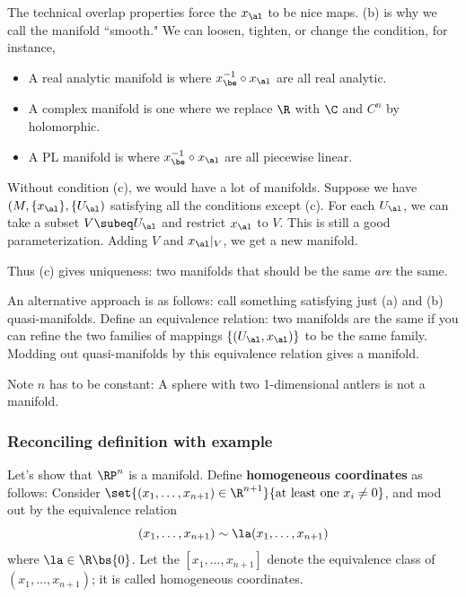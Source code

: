 The technical overlap properties force the $x_{\al}$ to be nice maps. (b) is why we call the manifold ``smooth." We can loosen, tighten, or change the condition, for instance,
\begin{itemize}
\item A real analytic manifold is where $x_{\be}^{-1}\circ x_{\al}$ are all real analytic.
\item A complex manifold is one where we replace $\R$ with $\C$ and $C^n$ by holomorphic.
\item A PL manifold is where $x_{\be}^{-1}\circ x_{\al}$ are all piecewise linear.
\end{itemize}

Without condition (c), we would have a lot of manifolds. Suppose we have $(M,\{x_{\al}\},\{U_{\al})$ satisfying all the conditions except (c). For each $U_{\al}$, we can take a subset $V\subeq U_{\al}$ and restrict $x_{\al}$ to $V$. This is still a good parameterization. Adding $V$ and $x_{\al}|_V$, we get a new manifold. 

Thus (c) gives uniqueness: two manifolds that should be the same {\it are} the same.

An alternative approach is as follows: call something satisfying just (a) and (b) quasi-manifolds. Define an equivalence relation: two manifolds are the same if you can refine the two families of mappings $\{(U_{\al},x_{\al})\}$ to be the same family. Modding out quasi-manifolds by this equivalence relation gives a manifold.

Note $n$ has to be constant: A sphere with two 1-dimensional antlers is not a manifold.

\subsubsection{Reconciling definition with example}

Let's show that $\RP^n$ is a manifold. Define \textbf{homogeneous coordinates} as follows: 
Consider $\set{(x_1,\ldots, x_{n+1})\in \R^{n+1}}{\text{at least one }x_i\ne 0}$, and mod out by the equivalence relation
\[
(x_1,\ldots, x_{n+1})\sim \la (x_1,\ldots, x_{n+1})
\]
where $\la\in \R\bs \{0\}$. Let the $[x_1,\ldots, x_{n+1}]$ denote the equivalence class of $(x_1,\ldots, x_{n+1})$; it is called homogeneous coordinates.\\

